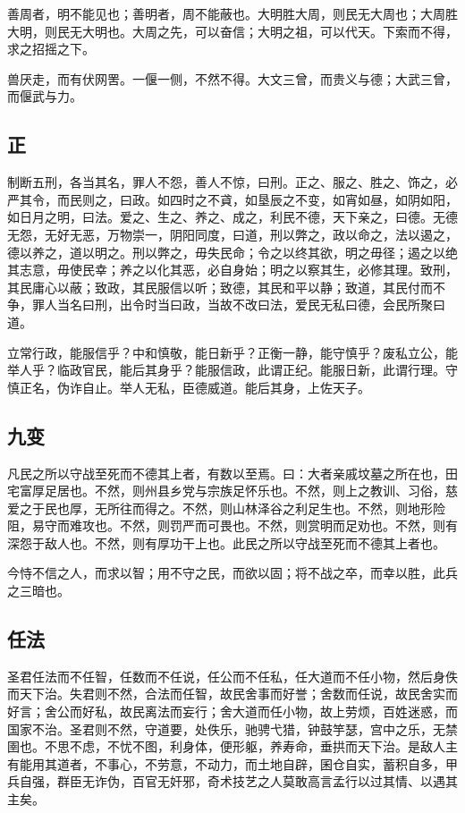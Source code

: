 \documentclass[]{article}
\begin{document}
善周者，明不能见也；善明者，周不能蔽也。大明胜大周，则民无大周也；大周胜大明，则民无大明也。大周之先，可以奋信；大明之祖，可以代天。下索而不得，求之招摇之下。

兽厌走，而有伏网罟。一偃一侧，不然不得。大文三曾，而贵义与德；大武三曾，而偃武与力。

\hypertarget{header-n582}{%
\subsection{正 }\label{header-n582}}

制断五刑，各当其名，罪人不怨，善人不惊，曰刑。正之、服之、胜之、饰之，必严其令，而民则之，曰政。如四时之不貣，如垦辰之不变，如宵如昼，如阴如阳，如日月之明，曰法。爱之、生之、养之、成之，利民不德，天下亲之，曰德。无德无怨，无好无恶，万物崇一，阴阳同度，曰道，刑以弊之，政以命之，法以遏之，德以养之，道以明之。刑以弊之，毋失民命；令之以终其欲，明之毋径；遏之以绝其志意，毋使民幸；养之以化其恶，必自身始；明之以察其生，必修其理。致刑，其民庸心以蔽；致政，其民服信以听；致德，其民和平以静；致道，其民付而不争，罪人当名曰刑，出令时当曰政，当故不改曰法，爱民无私曰德，会民所聚曰道。

立常行政，能服信乎？中和慎敬，能日新乎？正衡一静，能守慎乎？废私立公，能举人乎？临政官民，能后其身乎？能服信政，此谓正纪。能服日新，此谓行理。守慎正名，伪诈自止。举人无私，臣德威道。能后其身，上佐天子。

\hypertarget{header-n587}{%
\subsection{九变}\label{header-n587}}

凡民之所以守战至死而不德其上者，有数以至焉。曰：大者亲戚坟墓之所在也，田宅富厚足居也。不然，则州县乡党与宗族足怀乐也。不然，则上之教训、习俗，慈爱之于民也厚，无所往而得之。不然，则山林泽谷之利足生也。不然，则地形险阻，易守而难攻也。不然，则罚严而可畏也。不然，则赏明而足劝也。不然，则有深怨于敌人也。不然，则有厚功干上也。此民之所以守战至死而不德其上者也。

今恃不信之人，而求以智；用不守之民，而欲以固；将不战之卒，而幸以胜，此兵之三暗也。

\hypertarget{header-n592}{%
\subsection{任法}\label{header-n592}}

圣君任法而不任智，任数而不任说，任公而不任私，任大道而不任小物，然后身佚而天下治。失君则不然，合法而任智，故民舍事而好誉；舍数而任说，故民舍实而好言；舍公而好私，故民离法而妄行；舍大道而任小物，故上劳烦，百姓迷惑，而国家不治。圣君则不然，守道要，处佚乐，驰骋弋猎，钟鼓竽瑟，宫中之乐，无禁圉也。不思不虑，不忧不图，利身体，便形躯，养寿命，垂拱而天下治。是敌人主有能用其道者，不事心，不劳意，不动力，而土地自辟，囷仓自实，蓄积自多，甲兵自强，群臣无诈伪，百官无奸邪，奇术技艺之人莫敢高言孟行以过其情、以遇其主矣。
\end{document}
